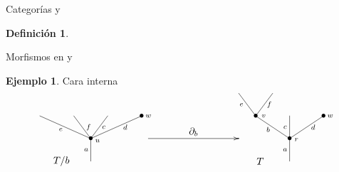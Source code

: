 \documentclass[12pt,aspectratio=169]{beamer}
\numberwithin{equation}{section}
\theoremstyle{definition}
\newtheorem{defi}[teo]{Definici\'on}
\newtheorem{ex}[teo]{Ejemplo}
\begin{document}
{\begin{frame}{Categor\'ias  y \pmb{$\Omega$}}
\begin{defi}
    \end{defi}
\end{frame}
\begin{frame}{Morfismos en  y \pmb{$\Omega$}}
    \begin{ex}
        Cara interna
        $$
            \xy
            <0.08cm, 0cm>:
            (0.0, 0.0)*{}="1"; %
            (0.0, 10.0)*=0{\bullet}="2"; %
            (-22.5, 20.0)*{}="3"; %
            (-7.5, 20.0)*{}="4"; %
            (7.5, 20.0)*{}="5"; %
            (22.5, 20.0)*=0{\bullet}="6"; %
            "1";"2" **\dir{-};
            "2";"3" **\dir{-};
            "2";"4" **\dir{-};
            "2";"5" **\dir{-};
            "2";"6" **\dir{-};
            (3.0, 9.0)*=0{\scriptstyle u};
            (25.5, 20.0)*=0{\scriptstyle w};
            (-2.0, 5.0)*=0{\scriptstyle a};
            (-13.25, 14.0)*=0{\scriptstyle e};
            (-1, 15.0)*=0{\scriptstyle f};
            (5.75, 15.0)*=0{\scriptstyle c};
            (15.25, 15.0)*=0{\scriptstyle d};
            (-13,0)*{T/b};
            \endxy
            \xy
            <0.08cm, 0cm>:
            (-20, 0.0)*{}="1";
            (20, 0.0)*{}="2";
            (20, 10)*{}="3";
            (-20, 10)*{}="4";
            {\ar(-20, 10)*{};(20,10)*{}};
            (0,13)*{\partial_b};
            \endxy
            \xy
            <0.08cm, 0cm>:
            (0.0, 0.0)*{}="1"; %
            (0.0, 10.0)*=0{\bullet}="2"; %
            (-15.0, 20.0)*=0{\bullet}="3"; %
            (-22.5, 30.0)*{}="4"; %
            (-7.5, 30.0)*{}="5"; %
            (0.0, 20.0)*{}="6"; %
            (15.0, 20.0)*=0{\bullet}="7"; %
            "1";"2" **\dir{-};
            "2";"3" **\dir{-};
            "3";"4" **\dir{-};
            "3";"5" **\dir{-};
            "2";"6" **\dir{-};
            "2";"7" **\dir{-};
            (3.0, 9.5)*=0{\scriptstyle r};
            (-11.5, 20.0)*=0{\scriptstyle v};
            (-2.0, 5.0)*=0{\scriptstyle a};
            (-9.5, 14.0)*=0{\scriptstyle b};
            (-21.3, 25.0)*=0{\scriptstyle e};
            (-9, 25.0)*=0{\scriptstyle f};
            (-2.0, 15.0)*=0{\scriptstyle c};
            (10.4, 15.0)*=0{\scriptstyle d};
            (18.0, 20.0)*=0{\scriptstyle w};
            (-13,0)*{T};
            \endxy
        $$
    \end{ex}
\end{frame}
}
\end{document}
